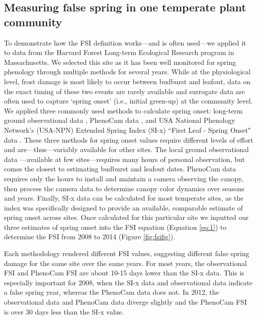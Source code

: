 \documentclass{article}\usepackage[]{graphicx}\usepackage[]{color}
\begin{document}
\subsection*{Measuring false spring in one temperate plant community}
To demonstrate how the FSI definition works---and is often used---we applied it to data from the Harvard Forest Long-term Ecological Research program in Massachusetts. We selected this site as it has been well monitored for spring phenology through multiple methods for several years. While at the physiological level, frost damage is most likely to occur between budburst and leafout, data on the exact timing of these two events are rarely available and surrogate data are often used to capture `spring onset' (i.e., initial green-up) at the community level. We applied three commonly used methods to calculate spring onset: long-term ground observational data \citep{Okeefe2014}, PhenoCam data \citep{Richardson2015}, and USA National Phenology Network's (USA-NPN) Extended Spring Index (SI-x) ``First Leaf - Spring Onset" data \citep{USA-NPN2016}. These three methods for spring onset values require different levels of effort and are---thus---variably available for other sites. The local ground observational data \citep{Okeefe2014}---available at few sites---requires many hours of personal observation, but comes the closest to estimating budburst and leafout dates. PhenoCam data requires only the hours to install and maintain a camera observing the canopy, then process the camera data to determine canopy color dynamics over seasons and years. Finally, SI-x data can be calculated for most temperate sites, as the index was specifically designed to provide an available, comparable estimate of spring onset across sites. Once calculated for this particular site we inputted our three estimates of spring onset into the FSI equation (Equation \ref{eq:1}) to determine the FSI from 2008 to 2014 (Figure \ref{fig:fsifig}). 

Each methodology rendered different FSI values, suggesting different false spring damage for the same site over the same years. For most years, the observational FSI and PhenoCam FSI are about 10-15 days lower than the SI-x data. This is especially important for 2008, when the SI-x data and observational data indicate a false spring year, whereas the PhenoCam data does not. In 2012, the observational data and PhenoCam data diverge slightly and the PhenoCam FSI is over 30 days less than the SI-x value.
\end{document}
